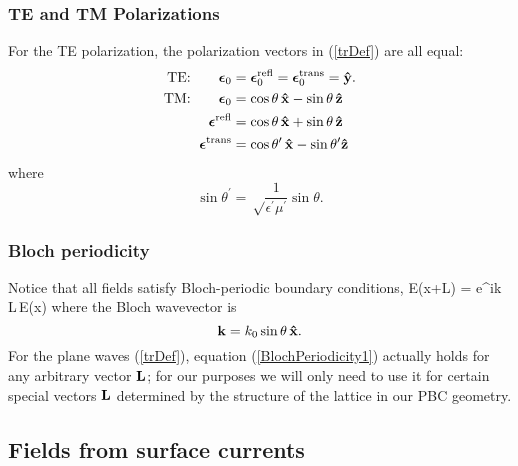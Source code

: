 \documentclass[letterpaper]{article}
\newcommand{\vbEps}{\boldsymbol{\epsilon}}
\begin{document}
\subsubsection*{TE and TM Polarizations} 

For the TE polarization, the polarization vectors in 
(\ref{trDef}) are all equal:
\begin{align*}
 \text{TE:} 
   \qquad \vbEps_0&=\vbEps_0\sups{refl}=\vbEps_0\sups{trans}=\vbhat{y}.
\\
 \text{TM:} 
   \qquad \vbEps_0&=\cos\theta\,\vbhat{x} - \sin\theta\,\vbhat{z} \\
 \vbEps\sups{refl}&=\cos\theta\,\vbhat{x} + \sin\theta\,\vbhat{z} \\
\vbEps\sups{trans}&=\cos\theta^\prime \, \vbhat{x} - \sin\theta^\prime\vbhat{z}
\end{align*}
where 
$$\sin\theta^\prime = \sqrt\frac{1}{\epsilon^\prime \mu^\prime} 
  \sin\theta.
$$

\subsubsection*{Bloch periodicity} 

Notice that all fields satisfy Bloch-periodic boundary conditions,
{\vb E(\vb x+\vb L) = e^{i\vb k \cdot \vb L}\,\vb E(\vb x)}
where the Bloch wavevector is 
$$\mathbf{k}=k_0 \sin\theta \, \mathbf{\hat x}.$$
For the plane waves (\ref{trDef}), equation (\ref{BlochPeriodicity1})
actually holds for any arbitrary vector $\mathbf{L}$; for our 
purposes we will only need to use it for certain special
vectors $\mathbf{L}$ determined by the structure of the lattice in
our PBC geometry.

\subsection*{Fields from surface currents}
\end{document}
